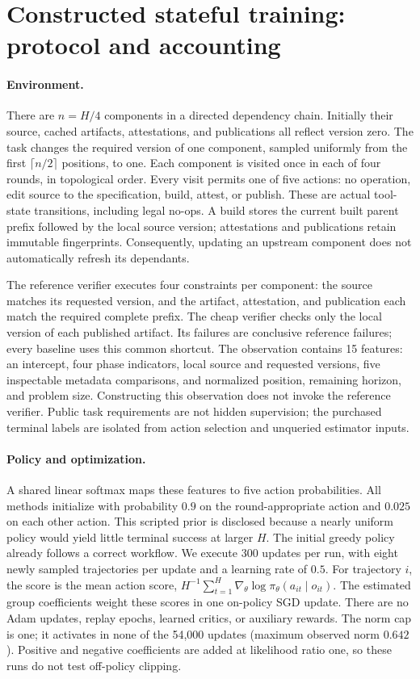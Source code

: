 \section{Constructed stateful training: protocol and accounting}
\label{app:stateful-training}
\label{app:stateful}

\paragraph{Environment.}
There are $n=H/4$ components in a directed dependency chain. Initially their
source, cached artifacts, attestations, and publications all reflect version
zero. The task changes the required version of one component, sampled
uniformly from the first $\lceil n/2\rceil$ positions, to one. Each component is
visited once in each of four rounds, in topological order. Every visit permits
one of five actions: no operation, edit source to the specification, build,
attest, or publish. These are actual tool-state transitions, including legal
no-ops. A build stores the current built parent prefix followed by the local
source version; attestations and publications retain immutable fingerprints.
Consequently, updating an upstream component does not automatically refresh
its dependants.

The reference verifier executes four constraints per component: the source
matches its requested version, and the artifact, attestation, and publication
each match the required complete prefix. The cheap verifier checks only the
local version of each published artifact. Its failures are conclusive
reference failures; every baseline uses this common shortcut. The observation
contains 15 features: an intercept, four phase indicators, local source and
requested versions, five inspectable metadata comparisons, and normalized
position, remaining horizon, and problem size. Constructing this observation
does not invoke the reference verifier. Public task requirements are not
hidden supervision; the purchased terminal labels are isolated from action
selection and unqueried estimator inputs.

\paragraph{Policy and optimization.}
A shared linear softmax maps these features to five action probabilities.
All methods initialize with probability $0.9$ on the round-appropriate action
and $0.025$ on each other action. This scripted prior is disclosed because a
nearly uniform policy would yield little terminal success at larger $H$.
The initial greedy policy already follows a correct workflow. We execute
300 updates per run, with eight newly sampled trajectories per update and
a learning rate of $0.5$. For trajectory $i$, the score is the mean action
score, $H^{-1}\sum_{t=1}^{H}\nabla_\theta\log\pi_\theta(a_{it}\mid o_{it})$.
The estimated group coefficients weight these scores in one on-policy SGD
update. There are no Adam updates, replay epochs, learned critics, or auxiliary
rewards. The norm cap is one; it activates in none of the 54,000 updates
(maximum observed norm $0.642$). Positive and negative coefficients are added
at likelihood ratio one, so these runs do not test off-policy clipping.

